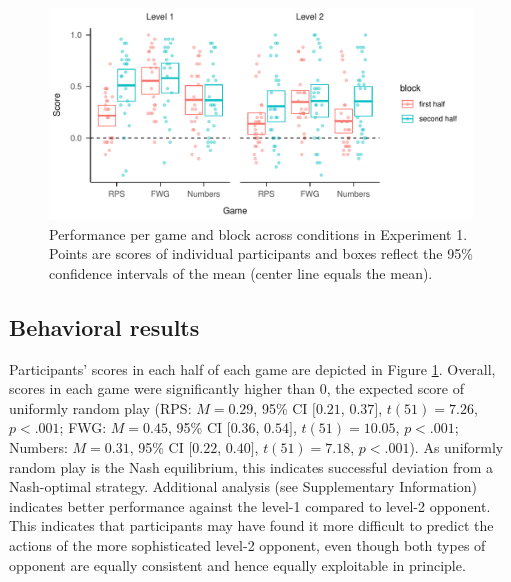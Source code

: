 \documentclass[smallextended]{svjour3}       %
\begin{document}
\begin{figure}

{\centering \includegraphics[width=\textwidth]{CBB_v2_files/figure-latex/exp1-avg-scores-game-1} 

}

\caption{Performance per game and block across conditions in Experiment 1. Points are scores of individual participants and boxes reflect the 95\% confidence intervals of the mean (center line equals the mean).}\label{fig:exp1-avg-scores-game}
\end{figure}

\hypertarget{behavioral-results}{%
\subsection{Behavioral results}\label{behavioral-results}}

Participants' scores in each half of each game are depicted in Figure
\ref{fig:exp1-avg-scores-game}. Overall, scores in each game were
significantly higher than 0, the expected score of uniformly random play
(RPS: \(M = 0.29\), 95\% CI \([0.21\), \(0.37]\), \(t(51) = 7.26\),
\(p < .001\); FWG: \(M = 0.45\), 95\% CI \([0.36\), \(0.54]\),
\(t(51) = 10.05\), \(p < .001\); Numbers: \(M = 0.31\), 95\% CI
\([0.22\), \(0.40]\), \(t(51) = 7.18\), \(p < .001\)). As uniformly
random play is the Nash equilibrium, this indicates successful deviation
from a Nash-optimal strategy. Additional analysis (see Supplementary
Information) indicates better performance against the level-1 compared
to level-2 opponent. This indicates that participants may have found it
more difficult to predict the actions of the more sophisticated level-2
opponent, even though both types of opponent are equally consistent and
hence equally exploitable in principle.
\end{document}
